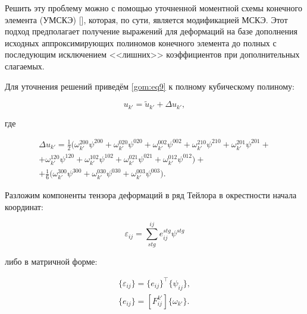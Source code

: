 Решить эту проблему можно с помощью уточненной моментной схемы конечного элемента (УМСКЭ) [], которая, по сути, является модификацией МСКЭ. Этот подход предполагает получение выражений для деформаций на базе дополнения исходных аппроксимирующих полиномов конечного элемента до полных с последующим исключением <<лишних>> коэффициентов при дополнительных слагаемых.



Для уточнения решений приведём \eqref{gom:eq9} к полному кубическому полиному:

\begin{equation}

\label{gom:eq10}

u_{k'}=\widetilde{u}_{k'}+\Delta u_{k'}, 

\end{equation}

где 

\begin{multline}

\Delta u_{k'}=\frac{1}{2}\bigl(\omega_{k'}^{200}\psi^{200}+\omega_{k'}^{020}\psi^{020}+\omega_{k'}^{002}\psi^{002}+\omega_{k'}^{210}\psi^{210}+

\omega_{k'}^{201}\psi^{201} + \\

+\omega_{k'}^{120}\psi^{120} +\omega_{k'}^{102}\psi^{102}+\omega_{k'}^{021}\psi^{021}+\omega_{k'}^{012}\psi^{012}\bigr)+

\\ 

+ \frac{1}{6}\bigl(\omega_{k'}^{300}\psi^{300}+\omega_{k'}^{030}\psi^{030}+\omega_{k'}^{003}\psi^{003}\bigr).

\end{multline}



Разложим компоненты тензора деформаций в ряд Тейлора в окрестности начала координат:

\begin{equation}

\label{gom:eq11}

\varepsilon_{ij}=\sum_{stg}^{ij} e_{ij}^{stg}\psi^{stg}

\end{equation}

либо в матричной форме:

\begin{gather}

\label{gom:eq12}

\{\varepsilon_{ij}\}=\{e_{ij}\}^\top\{\psi_{ij}\}, \\

\label{gom:eq13}

\{e_{ij}\}=[F_{ij}^{k'}]\{\omega_{k'}\}.

\end{gather}



